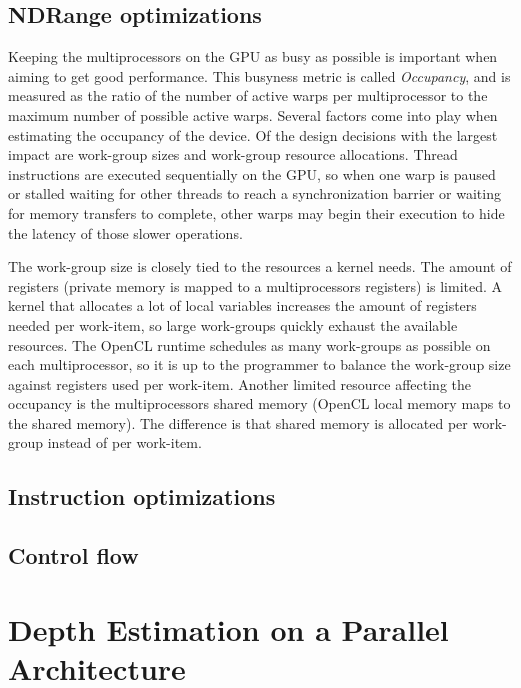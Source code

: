 \subsection{NDRange optimizations}
\label{sect:ndrange-optimization}

Keeping the multiprocessors on the GPU as busy as possible is important when
aiming to get good performance. This busyness metric is called
\textit{Occupancy}, and is measured as the ratio of the number of active warps
per multiprocessor to the maximum number of possible active warps. Several
factors come into play when estimating the occupancy of the device. Of the
design decisions with the largest impact are work-group sizes and work-group
resource allocations. Thread instructions are executed sequentially on the
GPU, so when one warp is paused or stalled waiting for other threads to reach
a synchronization barrier or waiting for memory transfers to complete, other
warps may begin their execution to hide the latency of those slower
operations.

The work-group size is closely tied to the resources a kernel needs. The
amount of registers (private memory is mapped to a multiprocessors registers)
is limited. A kernel that allocates a lot of local variables increases the
amount of registers needed per work-item, so large work-groups quickly exhaust
the available resources. The OpenCL runtime schedules as many work-groups as
possible on each multiprocessor, so it is up to the programmer to balance the
work-group size against registers used per work-item. Another limited resource
affecting the occupancy is the multiprocessors shared memory (OpenCL local
memory maps to the shared memory). The difference is that shared memory is
allocated per work-group instead of per work-item.



\subsection{Instruction optimizations}
\label{sect:instruction-optimization}

\subsection{Control flow}
\label{sect:control-flow}

\section{Depth Estimation on a Parallel Architecture}

